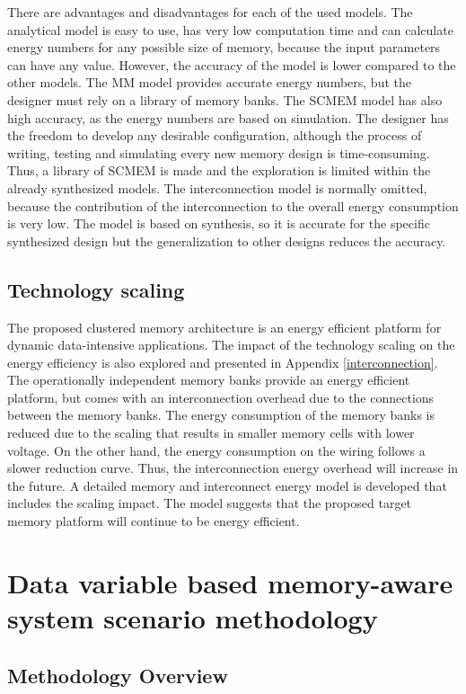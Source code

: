There are advantages and disadvantages for each of the used models.
The analytical model is easy to use, has very low computation time and can calculate energy numbers for any possible size of memory, because the input parameters can have any value.
However, the accuracy of the model is lower compared to the other models.
The MM model provides accurate energy numbers, but the designer must rely on a library of memory banks.
The SCMEM model has also high accuracy, as the energy numbers are based on simulation.
The designer has the freedom to develop any desirable configuration, although the process of writing, testing and simulating every new memory design is time-consuming.
Thus, a library of SCMEM is made and the exploration is limited within the already synthesized models.
The interconnection model is normally omitted, because the contribution of the interconnection to the overall energy consumption is very low.
The model is based on synthesis, so it is accurate for the specific synthesized design but the generalization to other designs reduces the accuracy. 

\subsection{Technology scaling}

The proposed clustered memory architecture is an energy efficient platform for dynamic data-intensive applications.
The impact of the technology scaling on the energy efficiency is also explored and presented in Appendix \ref{interconnection}. 
The operationally independent memory banks provide an energy efficient platform, but comes with an interconnection overhead due to the connections between the memory banks. 
The energy consumption of the memory banks is reduced due to the scaling that results in smaller memory cells with lower voltage.
On the other hand, the energy consumption on the wiring follows a slower reduction curve.
Thus, the interconnection energy overhead will increase in the future.
A detailed memory and interconnect energy model is developed that includes the scaling impact.
The model suggests that the proposed target memory platform will continue to be energy efficient.

\section{Data variable based memory-aware system scenario methodology}

\subsection{Methodology Overview}

